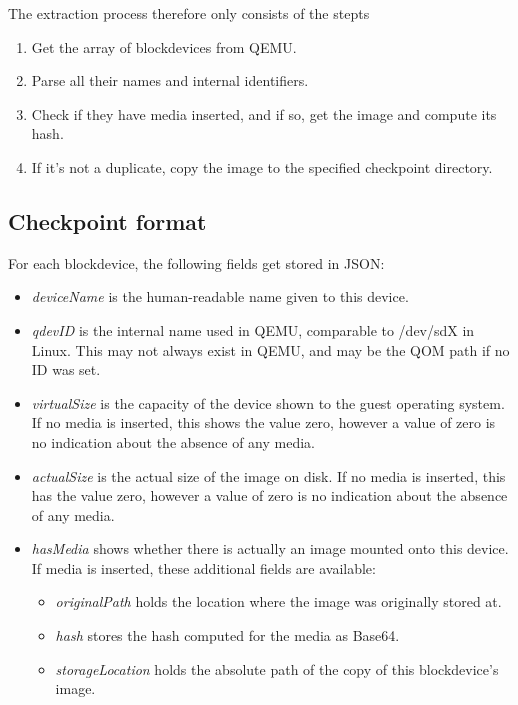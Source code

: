 The extraction process therefore only consists of the stepts
\begin{enumerate}
    \item Get the array of blockdevices from QEMU.
    \item Parse all their names and internal identifiers.
    \item Check if they have media inserted, and if so, get the image and compute its hash.
    \item If it's not a duplicate, copy the image to the specified checkpoint directory.
\end{enumerate}

\subsection{Checkpoint format}
For each blockdevice, the following fields get stored in JSON:
\begin{itemize}
    \item \emph{deviceName} is the human-readable name given to this device.
    \item \emph{qdevID} is the internal name used in QEMU, comparable to /dev/sdX in Linux.
    This may not always exist in QEMU, and may be the QOM path if no ID was set.
    \item \emph{virtualSize} is the capacity of the device shown to the guest operating system.
    If no media is inserted, this shows the value zero,
    however a value of zero is no indication about the absence of any media.
    \item \emph{actualSize} is the actual size of the image on disk.
    If no media is inserted, this has the value zero,
    however a value of zero is no indication about the absence of any media.
    \item \emph{hasMedia} shows whether there is actually an image mounted onto this device.
    If media is inserted, these additional fields are available:
    \begin{itemize}
        \item \emph{originalPath} holds the location where the image was originally stored at.
        \item \emph{hash} stores the hash computed for the media as Base64.
        \item \emph{storageLocation} holds the absolute path of the copy of this blockdevice's image.
    \end{itemize}
\end{itemize}

